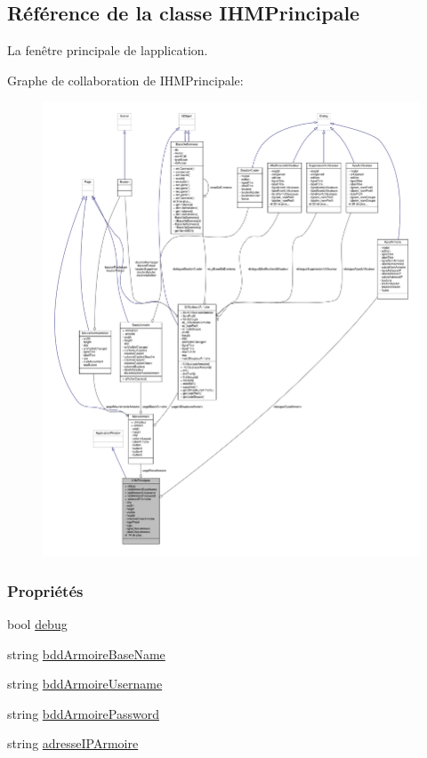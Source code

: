 \hypertarget{class_i_h_m_principale}{}\subsection{Référence de la classe I\+H\+M\+Principale}
\label{class_i_h_m_principale}


La fenêtre principale de l\textquotesingle{}application.  




Graphe de collaboration de I\+H\+M\+Principale\+:\nopagebreak
\begin{figure}[H]
\begin{center}
\leavevmode
\includegraphics[width=350pt]{class_i_h_m_principale__coll__graph}
\end{center}
\end{figure}
\subsubsection*{Propriétés}
\begin{DoxyCompactItemize}
\item 
bool \hyperlink{class_i_h_m_principale_afb2c62d75d052c1b52122e797d978f6d}{debug}
\item 
string \hyperlink{class_i_h_m_principale_a99fa0498234daa461f355817b694d432}{bdd\+Armoire\+Base\+Name}
\item 
string \hyperlink{class_i_h_m_principale_a9e337305494a25ec9ed2880cfbf6994b}{bdd\+Armoire\+Username}
\item 
string \hyperlink{class_i_h_m_principale_a3de09677e625cc471851bfd563553070}{bdd\+Armoire\+Password}
\item 
string \hyperlink{class_i_h_m_principale_a83192d9bd52abe3ac0e11a2b9cd02823}{adresse\+I\+P\+Armoire}
\end{DoxyCompactItemize}
